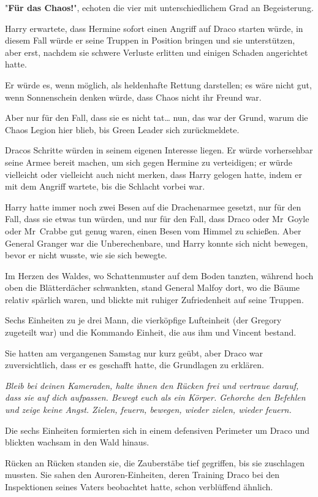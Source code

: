 {"\textbf{Für das Chaos!}", echoten die vier mit unterschiedlichem Grad an Begeisterung.

Harry erwartete, dass Hermine sofort einen Angriff auf Draco starten würde, in diesem Fall würde er seine Truppen in Position bringen und sie unterstützen, aber erst, nachdem sie schwere Verluste erlitten und einigen Schaden angerichtet hatte.

Er würde es, wenn möglich, als heldenhafte Rettung darstellen; es wäre nicht gut, wenn Sonnenschein denken würde, dass Chaos nicht ihr Freund war.

Aber nur für den Fall, dass sie es nicht tat… nun, das war der Grund, warum die Chaos Legion hier blieb, bis Green Leader sich zurückmeldete.

Dracos Schritte würden in seinem eigenen Interesse liegen. Er würde vorhersehbar seine Armee bereit machen, um sich gegen Hermine zu verteidigen; er würde vielleicht oder vielleicht auch nicht merken, dass Harry gelogen hatte, indem er mit dem Angriff wartete, bis die Schlacht vorbei war.

Harry hatte immer noch zwei Besen auf die Drachenarmee gesetzt, nur für den Fall, dass sie etwas tun würden, und nur für den Fall, dass Draco oder Mr~Goyle oder Mr~Crabbe gut genug waren, einen Besen vom Himmel zu schießen. Aber General Granger war die Unberechenbare, und Harry konnte sich nicht bewegen, bevor er nicht wusste, wie sie sich bewegte.

Im Herzen des Waldes, wo Schattenmuster auf dem Boden tanzten, während hoch oben die Blätterdächer schwankten, stand General Malfoy dort, wo die Bäume relativ spärlich waren, und blickte mit ruhiger Zufriedenheit auf seine Truppen.

Sechs Einheiten zu je drei Mann, die vierköpfige Lufteinheit (der Gregory zugeteilt war) und die Kommando Einheit, die aus ihm und Vincent bestand.

Sie hatten am vergangenen Samstag nur kurz geübt, aber Draco war zuversichtlich, dass er es geschafft hatte, die Grundlagen zu erklären.

\emph{Bleib bei deinen Kameraden, halte ihnen den Rücken frei und vertraue darauf, dass sie auf dich aufpassen. Bewegt euch als ein Körper. Gehorche den Befehlen und zeige keine Angst. Zielen, feuern, bewegen, wieder zielen, wieder feuern.}

Die sechs Einheiten formierten sich in einem defensiven Perimeter um Draco und blickten wachsam in den Wald hinaus.

Rücken an Rücken standen sie, die Zauberstäbe tief gegriffen, bis sie zuschlagen mussten. Sie sahen den Auroren-Einheiten, deren Training Draco bei den Inspektionen seines Vaters beobachtet hatte, schon verblüffend ähnlich.

}

